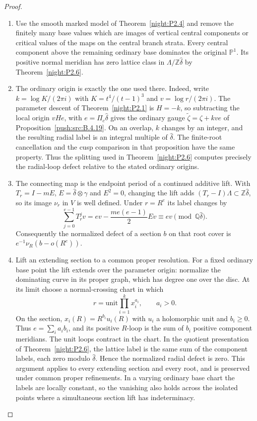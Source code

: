 \begin{proof}
\begin{enumerate}[label=\arabic*.,leftmargin=*]
\item Use the smooth marked model of Theorem~\ref{night:P2.4} and remove the finitely many base values which are images of vertical central components or critical values of the maps on the central branch strata. Every central component above the remaining ordinary base dominates the original $\mathbb P^1$. Its positive normal meridian has zero lattice class in $\Lambda/\mathbb Z\widehat\delta$ by Theorem~\ref{night:P2.6}.

\item The ordinary origin is exactly the one used there. Indeed, write $k=\log K/(2\pi i)$ with $K=t^4/(t-1)^3$ and $v=\log r/(2\pi i)$. The parameter descent of Theorem~\ref{night:P2.1} is $H=-k$, so subtracting the local origin $vHe$, with $e=\Pi_c\widehat\delta$ gives the ordinary gauge $\widetilde\zeta=\zeta+kv e$ of Proposition~\ref{push:src:B.4.19}. On an overlap, $k$ changes by an integer, and the resulting radial label is an integral multiple of $\widehat\delta$. The finite-root cancellation and the cusp comparison in that proposition have the same property. Thus the splitting used in Theorem~\ref{night:P2.6} computes precisely the radial-loop defect relative to the stated ordinary origins.

\item The connecting map is the endpoint period of a continued additive lift. With $T_r=I-mE$, $E=\widehat\delta\otimes\gamma$ and $E^2=0$, changing the lift adds $(T_r-I)\Lambda\subset\mathbb Z\widehat\delta$, so its image $\nu_r$ in $V$ is well defined. Under $r=R^e$ its label changes by
\[
 \sum_{j=0}^{e-1}T_r^jv
 =ev-\frac{me(e-1)}2Ev
 \equiv ev\pmod{\mathbb Q\widehat\delta}.
\]
Consequently the normalized defect of a section $b$ on that root cover is $e^{-1}\nu_R(b-o(R^e))$.

\item Lift an extending section to a common proper resolution. For a fixed ordinary base point the lift extends over the parameter origin: normalize the dominating curve in its proper graph, which has degree one over the disc. At its limit choose a normal-crossing chart in which
\[
 r=\text{unit}\prod_{i=1}^k x_i^{a_i},\qquad a_i>0.
\]
On the section, $x_i(R)=R^{b_i}u_i(R)$ with $u_i$ a holomorphic unit and $b_i\ge0$. Thus $e=\sum_i a_i b_i$, and its positive $R$-loop is the sum of $b_i$ positive component meridians. The unit loops contract in the chart. In the quotient presentation of Theorem~\ref{night:P2.6}, the lattice label is the same sum of the component labels, each zero modulo $\widehat\delta$. Hence the normalized radial defect is zero. This argument applies to every extending section and every root, and is preserved under common proper refinements. In a varying ordinary base chart the labels are locally constant, so the vanishing also holds across the isolated points where a simultaneous section lift has indeterminacy.


\end{enumerate}
\end{proof}
